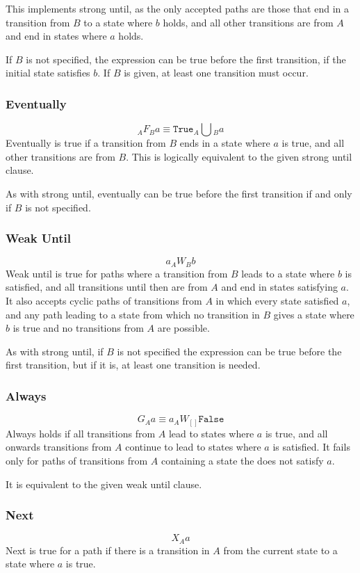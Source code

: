 \documentclass[a4paper,11pt]{article}
\begin{document}
	This implements strong until, as the only accepted paths are those that end in a transition from $B$ to a state where $b$ holds, and all other transitions are from $A$ and end in states where $a$ holds.
	
	If $B$ is not specified, the expression can be true before the first transition, if the initial state satisfies $b$. If $B$ is given, at least one transition must occur.
	
	\subsubsection{Eventually}
	$$_A F{_Ba} \equiv \texttt{True} _A\bigcup{_B a} $$
	Eventually is true if a transition from $B$ ends in a state where $a$ is true, and all other transitions are from $B$. This is logically equivalent to the given strong until clause.
	
	As with strong until, eventually can be true before the first transition if and only if $B$ is not specified.
	
	\subsubsection{Weak Until}
	$$a _A W{_B b} $$
	Weak until is true for paths where a transition from $B$ leads to a state where $b$ is satisfied, and all transitions until then are from $A$ and end in states satisfying $a$. It also accepts cyclic paths of transitions from $A$ in which every state satisfied $a$, and any path leading to a state from which no transition in $B$ gives a state where $b$ is true and no transitions from $A$ are possible.
	
	As with strong until, if $B$ is not specified the expression can be true before the first transition, but if it is, at least one transition is needed.
	
	\subsubsection{Always}
	$$G{_Aa} \equiv a _A W{_{[]} \texttt{False}} $$
	Always holds if all transitions from $A$ lead to states where $a$ is true, and all onwards transitions from $A$ continue to lead to states where $a$ is satisfied. It fails only for paths of transitions from $A$ containing a state the does not satisfy $a$.
	
	It is equivalent to the given weak until clause.
	
	\subsubsection{Next}
	$$X{_Aa}$$
	Next is true for a path if there is a transition in $A$ from the current state to a state where $a$ is true. 
	
\end{document}
